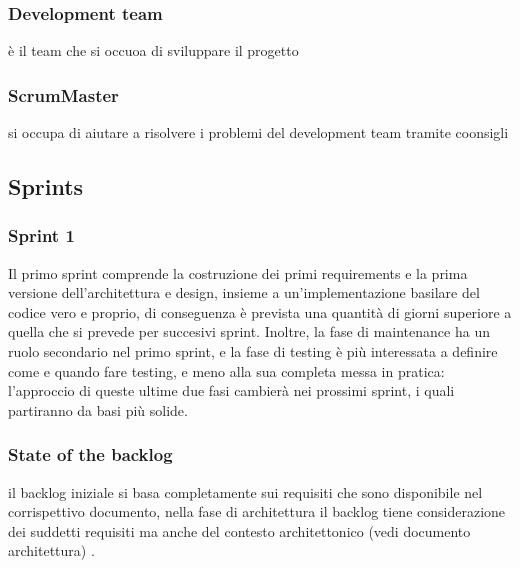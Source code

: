 \documentclass{article}
\begin{document}
\subsubsection{Development team} è il team che si occuoa di sviluppare il progetto 
\subsubsection{ScrumMaster} si occupa di aiutare a risolvere i problemi del development team tramite coonsigli

\subsection{Sprints} 
\subsubsection{Sprint 1}
Il primo sprint comprende la costruzione dei primi requirements e la prima versione dell’architettura e design, insieme a un’implementazione basilare del codice vero e proprio, di conseguenza è prevista una quantità di giorni superiore a quella che si prevede per succesivi sprint. Inoltre, la fase di maintenance ha un ruolo secondario nel primo sprint, e la fase di testing è più interessata a definire come e quando fare testing, e meno alla sua completa messa in pratica: l’approccio di queste ultime due fasi cambierà nei prossimi sprint, i quali partiranno da basi più solide. 
\subsubsection{State of the backlog}
il backlog iniziale si basa completamente sui requisiti che sono disponibile nel corrispettivo documento, nella fase di architettura il backlog tiene considerazione dei suddetti requisiti ma anche del contesto architettonico (vedi documento architettura) . 
\end{document}

